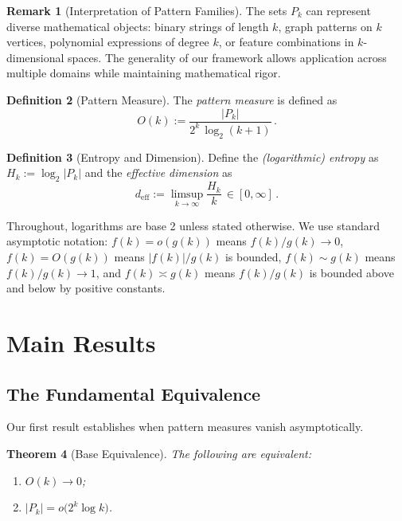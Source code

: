 \documentclass[11pt]{article}
\newtheorem{theorem}{Theorem}
\theoremstyle{definition}
\newtheorem{definition}[theorem]{Definition}
\newtheorem{remark}[theorem]{Remark}
\begin{document}
\begin{remark}[Interpretation of Pattern Families]\label{rem:interpretation}
The sets $P_k$ can represent diverse mathematical objects: binary strings of length $k$, graph patterns on $k$ vertices, polynomial expressions of degree $k$, or feature combinations in $k$-dimensional spaces. The generality of our framework allows application across multiple domains while maintaining mathematical rigor.
\end{remark} 

\begin{definition}[Pattern Measure]
The \emph{pattern measure} is defined as
\begin{equation}
O(k):= \frac{|P_k|}{2^k\,\log_2(k+1)}\,.
\end{equation}
\end{definition}

\begin{definition}[Entropy and Dimension]
Define the \emph{(logarithmic) entropy} as $H_k:=\log_2|P_k|$ and the \emph{effective dimension} as
\begin{equation}
d_{\mathrm{eff}}:=\limsup_{k\to\infty} \frac{H_k}{k}\,\in[0,\infty]\,.
\end{equation}
\end{definition}

Throughout, logarithms are base 2 unless stated otherwise. We use standard asymptotic notation: $f(k)=o(g(k))$ means $f(k)/g(k)\to 0$, $f(k)=O(g(k))$ means $|f(k)|/g(k)$ is bounded, $f(k)\sim g(k)$ means $f(k)/g(k) \to 1$, and $f(k)\asymp g(k)$ means $f(k)/g(k)$ is bounded above and below by positive constants.

\section{Main Results}

\subsection{The Fundamental Equivalence}

Our first result establishes when pattern measures vanish asymptotically.

\begin{theorem}[Base Equivalence]\label{thm:base-equivalence}
The following are equivalent:
\begin{enumerate}
\item[(i)] $O(k)\to 0$;
\item[(ii)] $|P_k|=o\big(2^k\log k\big)$.
\end{enumerate}
\end{theorem}
\end{document}
